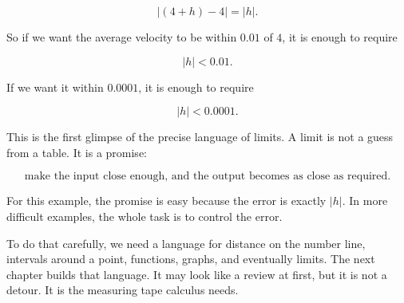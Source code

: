 \[
|(4+h)-4|=|h|.
\]

So if we want the average velocity to be within \(0.01\) of \(4\), it is enough to require

\[
|h|<0.01.
\]

If we want it within \(0.0001\), it is enough to require

\[
|h|<0.0001.
\]

This is the first glimpse of the precise language of limits. A limit is not a guess from a table. It is a promise:

\[
\text{make the input close enough, and the output becomes as close as required.}
\]

For this example, the promise is easy because the error is exactly \(|h|\). In more difficult examples, the whole task is to control the error.

To do that carefully, we need a language for distance on the number line, intervals around a point, functions, graphs, and eventually limits. The next chapter builds that language. It may look like a review at first, but it is not a detour. It is the measuring tape calculus needs.
